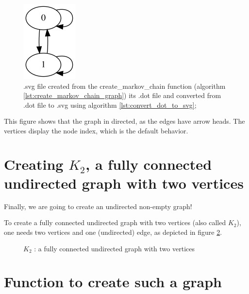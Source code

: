 \begin{figure}[!htbp]
  \includegraphics[]{create_markov_chain.png}
  \caption{
    .svg file created from the create\_markov\_chain function 
    (algorithm \ref{lst:create_markov_chain_graph}) 
    its .dot file and converted from .dot file to .svg using algorithm 
    \ref{lst:convert_dot_to_svg};
  }
  \label{fig:create_markov_chain.svg}
\end{figure}

This figure shows that the graph in directed, as the edges have arrow heads.
The vertices display the node index, which is the default behavior.

\section{Creating $K_{2}$, a fully connected undirected graph with two vertices}
\label{subsec:create_k2_graph}

Finally, we are going to create an undirected non-empty graph!

To create a fully connected undirected graph with two vertices (also called
$K_{2}$), 
one needs two vertices and one (undirected) edge, 
as depicted in figure \ref{fig:k2_graph}.


\begin{figure}
  \caption{$K_{2}$ : a fully connected undirected graph with two vertices}
  \label{fig:k2_graph}
\end{figure}

\section{Function to create such a graph}

